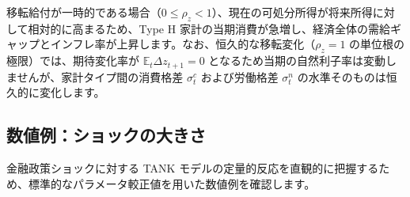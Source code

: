\documentclass[
  japanese,
  lualatex,
  ja=standard,
  12pt,
  a4paper]{ltjsarticle}
\begin{document}
移転給付が一時的である場合（\(0 \leq \rho_z < 1\)）、現在の可処分所得が将来所得に対して相対的に高まるため、Type
H
家計の当期消費が急増し、経済全体の需給ギャップとインフレ率が上昇します。なお、恒久的な移転変化（\(\rho_z = 1\)
の単位根の極限）では、期待変化率が \(\mathbb{E}_t \Delta z_{t+1} = 0\)
となるため当期の自然利子率は変動しませんが、家計タイプ間の消費格差
\(\sigma_t^c\) および労働格差 \(\sigma_t^n\)
の水準そのものは恒久的に変化します。


\subsection{数値例：ショックの大きさ}\label{ux6570ux5024ux4f8bux30b7ux30e7ux30c3ux30afux306eux5927ux304dux3055}

金融政策ショックに対する TANK
モデルの定量的反応を直観的に把握するため、標準的なパラメータ較正値を用いた数値例を確認します。
\end{document}
